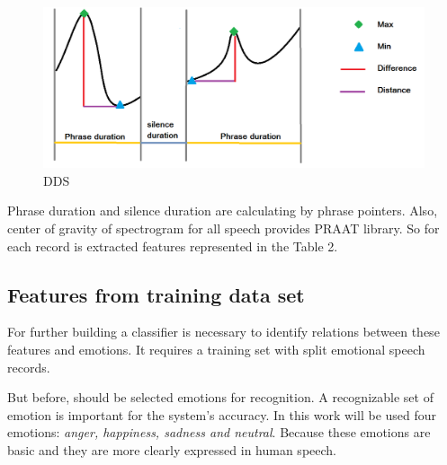 \documentclass[14pt]{extarticle}
\begin{document}
\begin{figure}
	\centering
		\includegraphics[scale=0.5]{images/dds.png}
	\caption{DDS}
	\label{fig:dds}
\end{figure}
Phrase duration and silence duration are calculating by phrase pointers. Also, center of gravity of spectrogram for all speech provides PRAAT library. So for each record is extracted features represented in the Table 2.
\subsection{Features from training data set}
For further building a classifier is necessary to identify relations between these features and emotions. It requires a training set with split emotional speech records. 

But before, should be selected emotions for recognition. A recognizable set of emotion is important for the system's accuracy. In this work will be used four emotions: \emph{anger, happiness, sadness and neutral}. Because these emotions are basic and they are more clearly expressed in human speech.
\end{document}
